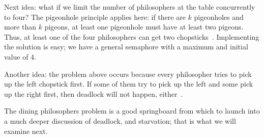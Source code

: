 Next idea: what if we limit the number of philosophers at the table concurrently to four? The pigeonhole principle applies here: if there are $k$ pigeonholes and more than $k$ pigeons, at least one pigeonhole must have at least two pigeons. Thus, at least one of the four philosophers can get two chopsticks~\cite{mte241}. Implementing the solution is easy; we have a general semaphore with a maximum and initial value of 4.

Another idea: the problem above occurs because every philosopher tries to pick up the left chopstick first. If some of them try to pick up the left and some pick up the right first, then deadlock will not happen, either~\cite{osc}.

The dining philosophers problem is a good springboard from which to launch into a much deeper discussion of deadlock, and starvation; that is what we will examine next.



